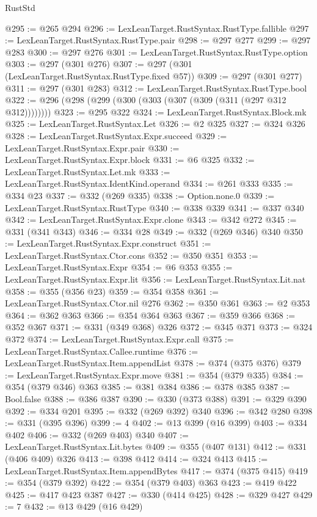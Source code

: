 \begin{lexlean}{RustStd}
\begin{coremodule}
{\begin{coremodule}
{{{{{@295 := @265 @294
@296 := LexLeanTarget.RustSyntax.RustType.fallible
@297 := LexLeanTarget.RustSyntax.RustType.pair
@298 := @297 @277
@299 := @297 @283
@300 := @297 @276
@301 := LexLeanTarget.RustSyntax.RustType.option
@303 := @297 (@301 @276)
@307 := @297 (@301 (LexLeanTarget.RustSyntax.RustType.fixed @57))
@309 := @297 (@301 @277)
@311 := @297 (@301 @283)
@312 := LexLeanTarget.RustSyntax.RustType.bool
@322 := @296 (@298 (@299 (@300 (@303 (@307 (@309 (@311 (@297 @312 @312))))))))
@323 := @295 @322
@324 := LexLeanTarget.RustSyntax.Block.mk
@325 := LexLeanTarget.RustSyntax.Let
@326 := @2 @325
@327 := @324 @326
@328 := LexLeanTarget.RustSyntax.Expr.succeed
@329 := LexLeanTarget.RustSyntax.Expr.pair
@330 := LexLeanTarget.RustSyntax.Expr.block
@331 := @6 @325
@332 := LexLeanTarget.RustSyntax.Let.mk
@333 := LexLeanTarget.RustSyntax.IdentKind.operand
@334 := @261 @333
@335 := @334 @23
@337 := @332 (@269 @335)
@338 := Option.none.{0}
@339 := LexLeanTarget.RustSyntax.RustType
@340 := @338 @339
@341 := @337 @340
@342 := LexLeanTarget.RustSyntax.Expr.clone
@343 := @342 @272
@345 := @331 (@341 @343)
@346 := @334 @28
@349 := @332 (@269 @346) @340
@350 := LexLeanTarget.RustSyntax.Expr.construct
@351 := LexLeanTarget.RustSyntax.Ctor.cons
@352 := @350 @351
@353 := LexLeanTarget.RustSyntax.Expr
@354 := @6 @353
@355 := LexLeanTarget.RustSyntax.Expr.lit
@356 := LexLeanTarget.RustSyntax.Lit.nat
@358 := @355 (@356 @23)
@359 := @354 @358
@361 := LexLeanTarget.RustSyntax.Ctor.nil @276
@362 := @350 @361
@363 := @2 @353
@364 := @362 @363
@366 := @354 @364 @363
@367 := @359 @366
@368 := @352 @367
@371 := @331 (@349 @368) @326
@372 := @345 @371
@373 := @324 @372
@374 := LexLeanTarget.RustSyntax.Expr.call
@375 := LexLeanTarget.RustSyntax.Callee.runtime
@376 := LexLeanTarget.RustSyntax.Item.appendList
@378 := @374 (@375 @376)
@379 := LexLeanTarget.RustSyntax.Expr.move
@381 := @354 (@379 @335)
@384 := @354 (@379 @346) @363
@385 := @381 @384
@386 := @378 @385
@387 := Bool.false
@388 := @386 @387
@390 := @330 (@373 @388)
@391 := @329 @390
@392 := @334 @201
@395 := @332 (@269 @392) @340
@396 := @342 @280
@398 := @331 (@395 @396)
@399 := 4
@402 := @13 @399 (@16 @399)
@403 := @334 @402
@406 := @332 (@269 @403) @340
@407 := LexLeanTarget.RustSyntax.Lit.bytes
@409 := @355 (@407 @131)
@412 := @331 (@406 @409) @326
@413 := @398 @412
@414 := @324 @413
@415 := LexLeanTarget.RustSyntax.Item.appendBytes
@417 := @374 (@375 @415)
@419 := @354 (@379 @392)
@422 := @354 (@379 @403) @363
@423 := @419 @422
@425 := @417 @423 @387
@427 := @330 (@414 @425)
@428 := @329 @427
@429 := 7
@432 := @13 @429 (@16 @429)
}}}}}
\end{coremodule}}
\end{coremodule}
\end{lexlean}
